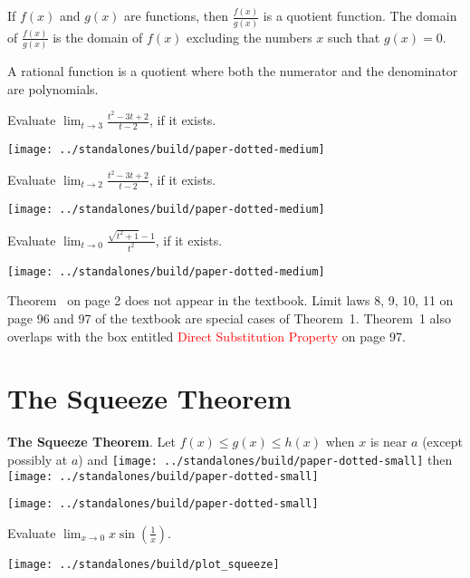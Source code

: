 \documentclass[../main.tex]{subfiles}
\begin{document}
If \(f(x)\) and \(g(x)\) are functions, then \(\frac{f(x)}{g(x)}\) is a {quotient} function. The domain of \(\frac{f(x)}{g(x)}\) is the domain of \(f(x)\) excluding the numbers \(x\) such that {\(g(x) = 0\).}

A {rational function} is a quotient where both the numerator and the denominator are {polynomials.}

\begin{example}
  Evaluate \(\lim_{t \to 3} \frac{t^{2} - 3t + 2}{t - 2}\), if it exists.
\end{example}
\texttt{[image: ../standalones/build/paper-dotted-medium]}

\begin{example}
  Evaluate \(\lim_{t \to 2} \frac{t^{2} - 3t + 2}{t - 2}\), if it exists.
\end{example}
\texttt{[image: ../standalones/build/paper-dotted-medium]}
\clearpage

\begin{example}
  Evaluate \(\lim_{t \to 0} \frac{\sqrt{t^{2}+1}-1}{t^{2}}\), if it exists.
\end{example}
\texttt{[image: ../standalones/build/paper-dotted-medium]}

\faExclamationTriangle{} Theorem~\faStar{} on page 2 does not appear in the textbook. Limit laws 8, 9, 10, 11 on page 96 and 97 of the textbook are special cases of Theorem~1. Theorem~1 also overlaps with the box entitled \textcolor{red}{Direct Substitution Property} on page 97.

\clearpage

\section{The Squeeze Theorem}
\begin{mdframed}[style=withref]
  \textbf{The Squeeze Theorem}. Let {\(f(x) \le g(x) \le h(x)\)} when \(x\) is near \(a\) (except possibly at \(a\)) and
  \texttt{[image: ../standalones/build/paper-dotted-small]}
  then
  \texttt{[image: ../standalones/build/paper-dotted-small]}

\end{mdframed}
\texttt{[image: ../standalones/build/paper-dotted-small]}

\begin{example}
  Evaluate \(\lim_{x \to 0} x \sin\left(\frac{1}{x}\right)\).

  \hfill\texttt{[image: ../standalones/build/plot\_squeeze]}
\end{example}
\clearpage
\end{document}

